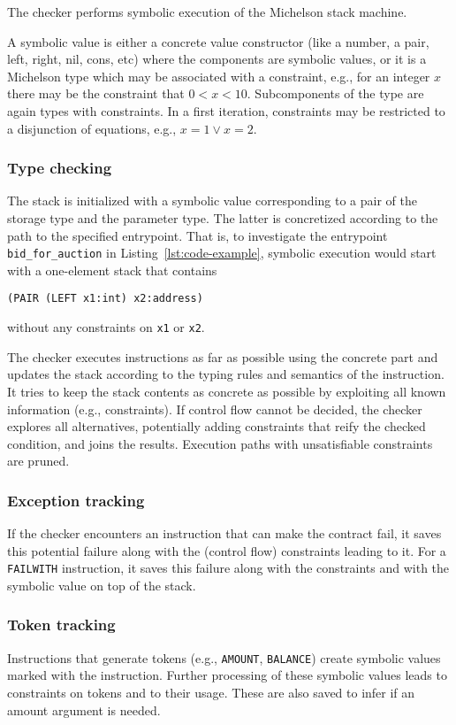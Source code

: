 \documentclass[a4paper]{llncs}
\begin{document}
The checker performs symbolic execution of the Michelson stack
machine.


A symbolic value is either a concrete value
constructor (like a number, a pair, left, right, nil, cons, etc) where
the components are symbolic values, or it is a Michelson type which
may be associated with a constraint, e.g., for an integer $x$ there 
may be the constraint that $0<x<10$. Subcomponents of the type are
again types with constraints. In a first iteration, constraints may be
restricted to a disjunction of equations, e.g., $x=1 \vee x=2$.

\subsubsection{Type checking}
\label{sec:type-checking}

 The stack is initialized with a symbolic value corresponding to a pair
of the storage type and the parameter type. The latter is concretized
according to the path to the specified entrypoint. That is, to
investigate the entrypoint \lstinline/bid_for_auction/ in
Listing~\ref{lst:code-example}, symbolic execution would start with a
one-element stack that contains
\begin{lstlisting}[language=michelson]
(PAIR (LEFT x1:int) x2:address)
\end{lstlisting}
without any constraints on \texttt{x1} or \texttt{x2}.

The checker executes instructions as far as possible using the
concrete part and updates the stack according to the typing rules and
semantics of the instruction. It tries to keep the
stack contents as concrete as possible by exploiting all known information
(e.g., constraints). If control flow cannot be decided, the checker
explores all alternatives, potentially adding constraints that reify the
checked condition, and joins the results. Execution paths with
unsatisfiable constraints are pruned.

\subsubsection{Exception tracking}
\label{sec:exception-tracking}

If the checker encounters an instruction that can make the contract
fail, it saves this potential failure along with the (control flow) constraints
leading to it. For a \texttt{FAILWITH} instruction, it saves
this failure along with the constraints and with the symbolic value on
top of the stack.

\subsubsection{Token tracking}
\label{sec:token-tracking}

Instructions that generate tokens (e.g., \texttt{AMOUNT},
\texttt{BALANCE}) create symbolic values marked with 
the instruction. Further processing of these symbolic values leads to
constraints on tokens and to their usage. These are also saved to
infer if an amount argument is needed.
\end{document}
